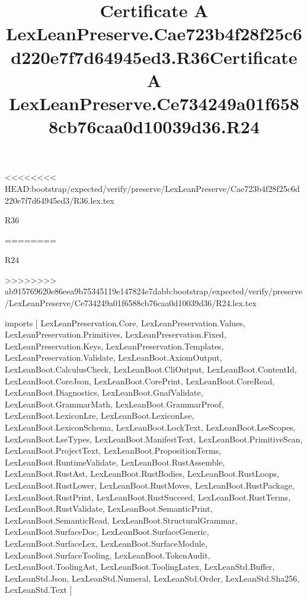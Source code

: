 <<<<<<<< HEAD:bootstrap/expected/verify/preserve/LexLeanPreserve/Cae723b4f28f25c6d220e7f7d64945ed3/R36.lex.tex
\begin{lexlean}{R36}
\title{Certificate A LexLeanPreserve.Cae723b4f28f25c6d220e7f7d64945ed3.R36}
========
\begin{lexlean}{R24}
\title{Certificate A LexLeanPreserve.Ce734249a01f6588cb76caa0d10039d36.R24}
>>>>>>>> ab915769620e86eea9b75345119e147824e7dabb:bootstrap/expected/verify/preserve/LexLeanPreserve/Ce734249a01f6588cb76caa0d10039d36/R24.lex.tex
\begin{coremodule}
imports [
  LexLeanPreservation.Core,
  LexLeanPreservation.Values,
  LexLeanPreservation.Primitives,
  LexLeanPreservation.Fixed,
  LexLeanPreservation.Keys,
  LexLeanPreservation.Templates,
  LexLeanPreservation.Validate,
  LexLeanBoot.AxiomOutput,
  LexLeanBoot.CalculusCheck,
  LexLeanBoot.CliOutput,
  LexLeanBoot.ContentId,
  LexLeanBoot.CoreJson,
  LexLeanBoot.CorePrint,
  LexLeanBoot.CoreRead,
  LexLeanBoot.Diagnostics,
  LexLeanBoot.GnafValidate,
  LexLeanBoot.GrammarMath,
  LexLeanBoot.GrammarProof,
  LexLeanBoot.LexiconLre,
  LexLeanBoot.LexiconLse,
  LexLeanBoot.LexiconSchema,
  LexLeanBoot.LockText,
  LexLeanBoot.LseScopes,
  LexLeanBoot.LseTypes,
  LexLeanBoot.ManifestText,
  LexLeanBoot.PrimitiveScan,
  LexLeanBoot.ProjectText,
  LexLeanBoot.PropositionTerms,
  LexLeanBoot.RuntimeValidate,
  LexLeanBoot.RustAssemble,
  LexLeanBoot.RustAst,
  LexLeanBoot.RustBodies,
  LexLeanBoot.RustLoops,
  LexLeanBoot.RustLower,
  LexLeanBoot.RustMoves,
  LexLeanBoot.RustPackage,
  LexLeanBoot.RustPrint,
  LexLeanBoot.RustSucceed,
  LexLeanBoot.RustTerms,
  LexLeanBoot.RustValidate,
  LexLeanBoot.SemanticPrint,
  LexLeanBoot.SemanticRead,
  LexLeanBoot.StructuralGrammar,
  LexLeanBoot.SurfaceDoc,
  LexLeanBoot.SurfaceGeneric,
  LexLeanBoot.SurfaceLex,
  LexLeanBoot.SurfaceModule,
  LexLeanBoot.SurfaceTooling,
  LexLeanBoot.TokenAudit,
  LexLeanBoot.ToolingAst,
  LexLeanBoot.ToolingLatex,
  LexLeanStd.Buffer,
  LexLeanStd.Json,
  LexLeanStd.Numeral,
  LexLeanStd.Order,
  LexLeanStd.Sha256,
  LexLeanStd.Text
]


\end{coremodule}
\end{lexlean}
\end{lexlean}
